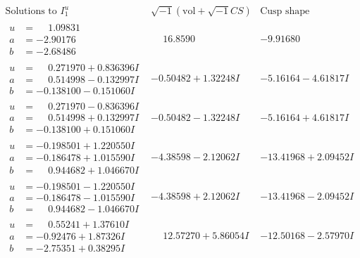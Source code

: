 \documentclass[1p]{elsarticle_modified}
\theoremstyle{definition}
\newcommand{\I}{\sqrt{-1}}
\begin{document}
$$\begin{array}{c|c|c}  
\text{Solutions to }I^u_{1}& \I (\text{vol} + \sqrt{-1}CS) & \text{Cusp shape}\\
 \hline 
\begin{aligned}
u &= \phantom{-}1.09831\phantom{ +0.000000I} \\
a &= -2.90176\phantom{ +0.000000I} \\
b &= -2.68486\phantom{ +0.000000I}\end{aligned}
 & \phantom{-}16.8590\phantom{ +0.000000I} & -9.91680\phantom{ +0.000000I} \\ \hline\begin{aligned}
u &= \phantom{-}0.271970 + 0.836396 I \\
a &= \phantom{-}0.514998 - 0.132997 I \\
b &= -0.138100 - 0.151060 I\end{aligned}
 & -0.50482 + 1.32248 I & -5.16164 - 4.61817 I \\ \hline\begin{aligned}
u &= \phantom{-}0.271970 - 0.836396 I \\
a &= \phantom{-}0.514998 + 0.132997 I \\
b &= -0.138100 + 0.151060 I\end{aligned}
 & -0.50482 - 1.32248 I & -5.16164 + 4.61817 I \\ \hline\begin{aligned}
u &= -0.198501 + 1.220550 I \\
a &= -0.186478 + 1.015590 I \\
b &= \phantom{-}0.944682 + 1.046670 I\end{aligned}
 & -4.38598 - 2.12062 I & -13.41968 + 2.09452 I \\ \hline\begin{aligned}
u &= -0.198501 - 1.220550 I \\
a &= -0.186478 - 1.015590 I \\
b &= \phantom{-}0.944682 - 1.046670 I\end{aligned}
 & -4.38598 + 2.12062 I & -13.41968 - 2.09452 I \\ \hline\begin{aligned}
u &= \phantom{-}0.55241 + 1.37610 I \\
a &= -0.92476 + 1.87326 I \\
b &= -2.75351 + 0.38295 I\end{aligned}
 & \phantom{-}12.57270 + 5.86054 I & -12.50168 - 2.57970 I \\ \hline\begin{aligned}

\end{aligned}
\end{array}$$
\end{document}
